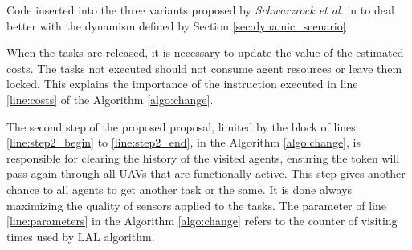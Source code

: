 \begin{algorithm}[!ht]
	\SetAlgoLined
	\DontPrintSemicolon
	\SetNlSkip{0.3em}	
	
	\caption{Code inserted into the three variants proposed by \textit{Schwarzrock et al.} in \cite{MAS07} to deal better with the dynamism defined by Section \ref{sec:dynamic_scenario} }
	\label{algo:change}
	\label{line:step2_end}
\end{algorithm}

When the tasks are released, it is necessary to update the value of the estimated costs. The tasks not executed should not consume agent resources or leave them locked. This explains the importance of the instruction executed in line \ref{line:costs} of the Algorithm \ref{algo:change}. 

The second step of the proposed proposal, limited by the block of lines \ref{line:step2_begin} to \ref{line:step2_end}, in the Algorithm \ref{algo:change}, is responsible for clearing the history of the visited agents, ensuring the token will pass again through all UAVs that are functionally active. This step gives another chance to all agents to get another task or the same. It is done always maximizing the quality of sensors applied to the tasks. The parameter of line \ref{line:parameters} in the Algorithm \ref{algo:change} refers to the counter of visiting times used by LAL algorithm.

